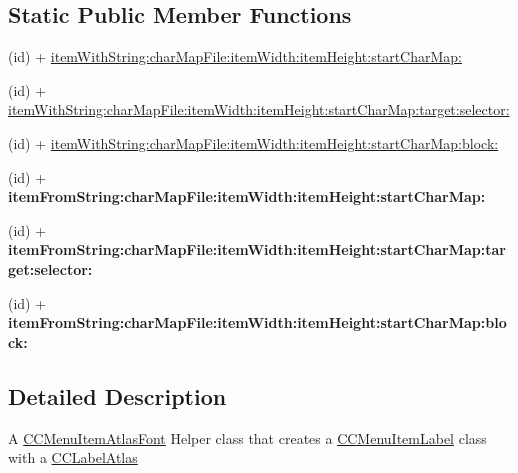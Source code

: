 \subsection*{Static Public Member Functions}
\begin{DoxyCompactItemize}
\item 
(id) + \hyperlink{class_c_c_menu_item_atlas_font_accaffe562eaeb3e91c4bce807597af78}{item\-With\-String\-:char\-Map\-File\-:item\-Width\-:item\-Height\-:start\-Char\-Map\-:}
\item 
(id) + \hyperlink{class_c_c_menu_item_atlas_font_a0e2ce6f361166144d881ab19e22cf726}{item\-With\-String\-:char\-Map\-File\-:item\-Width\-:item\-Height\-:start\-Char\-Map\-:target\-:selector\-:}
\item 
(id) + \hyperlink{class_c_c_menu_item_atlas_font_ac67cac1beef09fad81d5e8088df13cf2}{item\-With\-String\-:char\-Map\-File\-:item\-Width\-:item\-Height\-:start\-Char\-Map\-:block\-:}
\item 
\hypertarget{class_c_c_menu_item_atlas_font_a37adb40fe8653aaafe5fdb28575df0d3}{(id) + {\bfseries item\-From\-String\-:char\-Map\-File\-:item\-Width\-:item\-Height\-:start\-Char\-Map\-:}}\label{class_c_c_menu_item_atlas_font_a37adb40fe8653aaafe5fdb28575df0d3}

\item 
\hypertarget{class_c_c_menu_item_atlas_font_abf4205990571106a8afad21b42b1cd5c}{(id) + {\bfseries item\-From\-String\-:char\-Map\-File\-:item\-Width\-:item\-Height\-:start\-Char\-Map\-:target\-:selector\-:}}\label{class_c_c_menu_item_atlas_font_abf4205990571106a8afad21b42b1cd5c}

\item 
\hypertarget{class_c_c_menu_item_atlas_font_a9441a519419011774b57742ee28c7e6d}{(id) + {\bfseries item\-From\-String\-:char\-Map\-File\-:item\-Width\-:item\-Height\-:start\-Char\-Map\-:block\-:}}\label{class_c_c_menu_item_atlas_font_a9441a519419011774b57742ee28c7e6d}

\end{DoxyCompactItemize}


\subsection{Detailed Description}
A \hyperlink{class_c_c_menu_item_atlas_font}{C\-C\-Menu\-Item\-Atlas\-Font} Helper class that creates a \hyperlink{interface_c_c_menu_item_label}{C\-C\-Menu\-Item\-Label} class with a \hyperlink{interface_c_c_label_atlas}{C\-C\-Label\-Atlas} 

